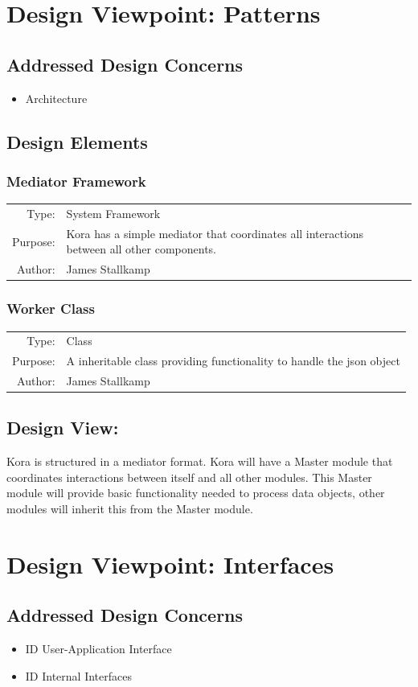 \documentclass[onecolumn, draftclsnofoot,10pt, compsoc]{IEEEtran}
\def \botname{Kora\xspace}
\newcommand{\designConcernRef}[2][]{
    #2 #1
}
\newcommand{\designElementDef}[4]{
    \subsubsection{#1}
    \begin{tabular}[t]{r p{6in}}
        Type: & #2 \\
        Purpose: & #3 \\
        Author: & #4 \\
    \end{tabular}
}
\begin{document}
		

\section{Design Viewpoint: Patterns}
    \subsection{Addressed Design Concerns}
        \begin{itemize}
            \item \designConcernRef[]{Architecture}
        \end{itemize}

    \subsection{Design Elements}
		\designElementDef{Mediator Framework}
						 {System Framework}
						 {\botname has a simple mediator that coordinates all interactions between all other components.}
						 {James Stallkamp}
		\designElementDef{Worker Class}
						 {Class}
						 {A inheritable class providing functionality to handle the json object}
						 {James Stallkamp}				 
    \subsection{Design View: }
		\botname is structured in a mediator format. 
		\botname will have a Master module that coordinates interactions between itself and all other modules.
		This Master module will provide basic functionality needed to process data objects, other modules will inherit this from the Master module. 


\section{Design Viewpoint: Interfaces}
    \subsection{Addressed Design Concerns}
        \begin{itemize}
            \item \designConcernRef[User-Application Interface]{ID}
            \item \designConcernRef[Internal Interfaces]{ID}
        \end{itemize}
\end{document}
